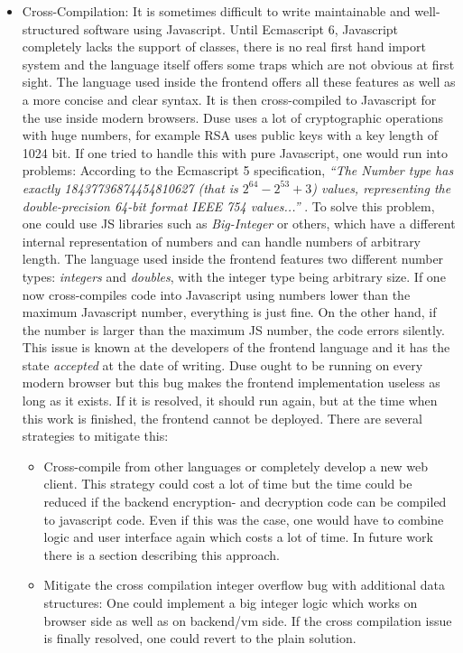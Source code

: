 \begin{itemize}
  \item Cross-Compilation: It is sometimes difficult to write maintainable and
  well-structured software using Javascript. Until Ecmascript 6, Javascript
  completely lacks the support of classes, there is no real first hand import
  system and the language itself offers some traps which are not obvious at
  first sight. The language used inside the frontend offers all these features
  as well as a more concise and clear syntax. It is then cross-compiled to
  Javascript for the use inside modern browsers.
  Duse uses a lot of cryptographic operations with huge numbers, for example
  RSA uses public keys with a key length of 1024 bit. If one tried to handle
  this with pure Javascript, one would run into problems: According to the
  Ecmascript 5 specification, \cite[p. 29]{ecmascriptfive} \textit{
  ``The Number type has exactly 18437736874454810627 (that is $2^{64}-2^{53}+3$)
  values, representing the double-precision 64-bit format IEEE 754 values...''
  }. To solve this problem, one could use JS libraries such as \textit{Big-Integer}
  or others, which have a different internal representation of numbers and
  can handle numbers of arbitrary length.
  The language used inside the frontend features two different number types:
  \textit{integers} and \textit{doubles}, with the integer type being arbitrary
  size. If one now cross-compiles code into Javascript using numbers lower than
  the maximum Javascript number, everything is just fine. On the other hand,
  if the number is larger than the maximum JS number, the code errors silently.
  This issue is known at the developers of the frontend language and it
  has the state \textit{accepted} at the date of writing. Duse ought to be
  running on every modern browser but this bug makes the frontend implementation
  useless as long as it exists. If it is resolved, it should run again, but
  at the time when this work is finished, the frontend cannot be deployed.
  There are several strategies to mitigate this:
  \begin{itemize}
    \item Cross-compile from other languages or completely develop a new
    web client. This strategy could cost a lot of time but the time could
    be reduced if the backend encryption- and decryption code can be
    compiled to javascript code. Even if this was the case, one would have
    to combine logic and user interface again which costs a lot of time.
    In future work there is a section describing this approach.

    \item Mitigate the cross compilation integer overflow bug with additional
    data structures: One could implement a big integer logic which works
    on browser side as well as on backend/vm side. If the cross compilation
    issue is finally resolved, one could revert to the plain solution.


\end{itemize}
\end{itemize}
